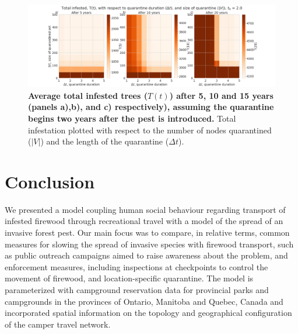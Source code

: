 \begin{figure}[!h]
    \centering
    \includegraphics[width =\textwidth]{chapter_2/node_quarantine_plot_2.0.png}
    \caption{\textbf{Average total infested trees ($T(t)$) after 5, 10 and 15 years (panels a),b), and c) respectively), assuming the quarantine begins two years after the pest is introduced.} Total infestation plotted with respect to the number of nodes quarantined ($|V|$) and the length of the quarantine ($\Delta t$).}
    \label{patch_quarantine_figure_t_1}
\end{figure}


\section{Conclusion}

We presented a model coupling human social behaviour regarding transport of infested firewood through recreational travel with a model of the spread of an invasive forest pest. Our main focus was to compare, in relative terms, common measures for slowing the spread of invasive species with firewood transport, such as public outreach campaigns aimed to raise awareness about the problem, and enforcement measures, including inspections at checkpoints to control the movement of firewood, and location-specific quarantine. The model is parameterized with campground reservation data for provincial parks and campgrounds in the provinces of Ontario, Manitoba and Quebec, Canada and incorporated spatial information on the topology and geographical configuration of the camper travel network.

